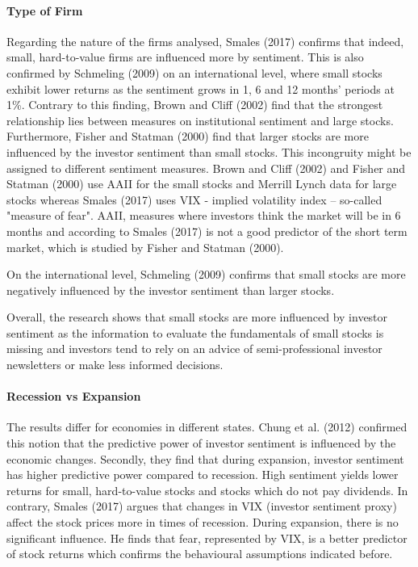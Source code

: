 \paragraph{Type of Firm} Regarding the nature of the firms analysed, Smales (2017) confirms that indeed, small, hard-to-value firms are influenced more by sentiment. This is also confirmed by Schmeling (2009) on an international level, where small stocks exhibit lower returns as the sentiment grows in 1, 6 and 12 months’ periods at 1\%. Contrary to this finding, Brown and Cliff (2002) find that the strongest relationship lies between measures on institutional sentiment and large stocks. Furthermore, Fisher and Statman (2000) find that larger stocks are more influenced by the investor sentiment than small stocks. This incongruity might be assigned to different sentiment measures. Brown and Cliff (2002) and Fisher and Statman (2000) use AAII for the small stocks and Merrill Lynch data for large stocks whereas Smales (2017) uses VIX - implied volatility index – so-called "measure of fear". AAII, measures where investors think the market will be in 6 months and according to Smales (2017) is not a good predictor of the short term market, which is studied by Fisher and Statman (2000).
\par
On the international level, Schmeling (2009) confirms that small stocks are more negatively influenced by the investor sentiment than larger stocks. 
\par
Overall, the research shows that small stocks are more influenced by investor sentiment as the information to evaluate the fundamentals of small stocks is missing and investors tend to rely on an advice of semi-professional investor newsletters or make less informed decisions.

\paragraph{Recession vs Expansion} The results differ for economies in different states. Chung et al. (2012) confirmed this notion that the predictive power of investor sentiment is influenced by the economic changes. Secondly, they find that during expansion, investor sentiment has higher predictive power compared to recession. High sentiment yields lower returns for small, hard-to-value stocks and stocks which do not pay dividends. In contrary, Smales (2017) argues that changes in VIX (investor sentiment proxy) affect the stock prices more in times of recession. During expansion, there is no significant influence. He finds that fear, represented by VIX, is a better predictor of stock returns which confirms the behavioural assumptions indicated before.


